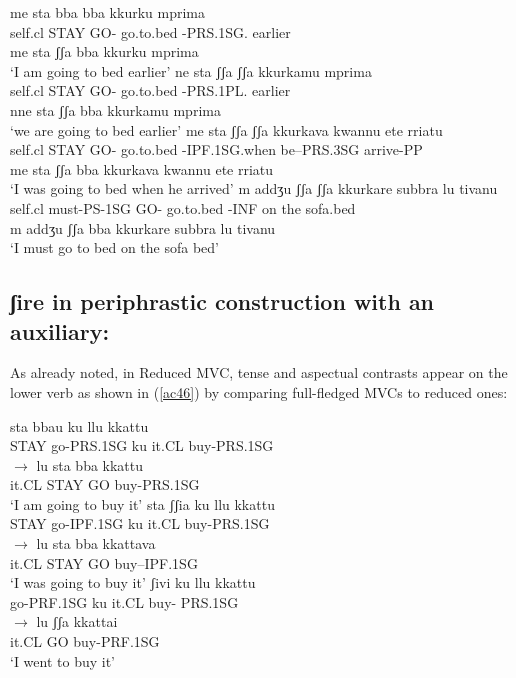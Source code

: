 \documentclass[output=paper]{langscibook}
\begin{document}
\ea \label{ac45}
    \ea \label{ac45a}\gll *me    sta     bba   bba kkurku      mprima\\
    self.cl  STAY   GO-   go.to.bed -PRS.1SG.   earlier\\
    \glt me sta  ʃʃa bba kkurku mprima\\
     ‘I am going to bed earlier’
    \ex \label{ac45b}\gll *ne    sta     ʃʃa   ʃʃa kkurkamu       mprima\\
    self.cl  STAY     GO-  go.to.bed -PRS.1PL.   earlier\\
    \glt nne sta ʃʃa bba kkurkamu mprima\\
    ‘we are going to bed earlier’
    \ex \label{ac45c}\gll *me   sta  ʃʃa ʃʃa kkurkava      kwannu ete rriatu\\
    self.cl  STAY  GO- go.to.bed -IPF.1SG.when  be--PRS.3SG arrive-PP\\
    \glt me sta ʃʃa bba kkurkava kwannu ete rriatu\\
    ‘I was going to bed when he arrived’
    \ex \label{ac45d}\gll *m   addʒu     ʃʃa ʃʃa  kkurkare    subbra lu tivanu\\
     self.cl  must-PS-1SG  GO- go.to.bed -INF  on    the  sofa.bed\\
    \glt m addʒu ʃʃa bba kkurkare subbra lu tivanu\\
    ‘I must go to bed on the sofa bed’
    \z
\z

\subsection{ʃire in periphrastic construction with an auxiliary:}

As already noted, in Reduced MVC, tense and aspectual contrasts appear on the lower verb as shown in (\ref{ac46}) by comparing full-fledged MVCs to reduced ones:

\ea\label{ac46}
    \ea\label{ac46a}
        \ea \label{ac46ai}\gll sta    bbau     ku   llu   kkattu\\
        STAY go-PRS.1SG  ku   it.CL buy-PRS.1SG   \\
        \ex \label{ac46aii}$\rightarrow$ \gll lu    sta    bba  kkattu\\
        it.CL  STAY GO  buy-PRS.1SG \\
        \glt ‘I am going to buy it’
        \z
    \ex\label{ac46b}
        \ea  \label{ac46bi}\gll sta    ʃʃia       ku   llu    kkattu \\
       STAY go-IPF.1SG  ku   it.CL  buy-PRS.1SG  \\
        \ex  \label{ac46bii}$\rightarrow$ \gll lu    sta    bba   kkattava\\
       it.CL   STAY GO   buy--IPF.1SG\\
       \glt ‘I was going to buy it’
        \z
    \ex\label{ac46c}
        \ea  \label{ac46ci}\gll ʃivi       ku   llu   kkattu \\
       go-PRF.1SG  ku   it.CL  buy- PRS.1SG \\
        \ex  \label{ac46cii}$\rightarrow$ \gll lu     ʃʃa   kkattai\\
       it.CL   GO  buy-PRF.1SG\\
       \glt ‘I went to buy it’
        \z
    \z
\z
\end{document}
